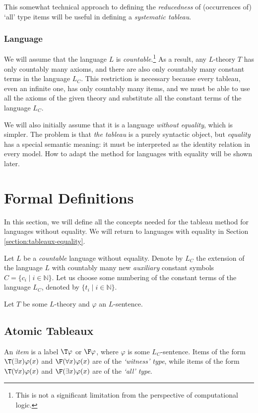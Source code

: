 This somewhat technical approach to defining the \emph{reducedness} of (occurrences of) `all' type items will be useful in defining a \emph{systematic tableau}.

\subsubsection{Language}

We will assume that the language $L$ is \emph{countable}.\footnote{This is not a significant limitation from the perspective of computational logic.} As a result, any $L$-theory $T$ has only countably many axioms, and there are also only countably many constant terms in the language $L_C$. This restriction is necessary because every tableau, even an infinite one, has only countably many items, and we must be able to use all the axioms of the given theory and substitute all the constant terms of the language $L_C$.

We will also initially assume that it is a language \emph{without equality}, which is simpler. The problem is that \emph{the tableau} is a purely syntactic object, but \emph{equality} has a special semantic meaning: it must be interpreted as the identity relation in every model. How to adapt the method for languages with equality will be shown later.

\section{Formal Definitions}

In this section, we will define all the concepts needed for the tableau method for languages without equality. We will return to languages with equality in Section \ref{section:tableaux-equality}.

Let $L$ be a \emph{countable} language without equality. Denote by $L_C$ the extension of the language $L$ with countably many new \emph{auxiliary} constant symbols $C=\{c_i\mid i\in \mathbb N\}$. Let us choose some numbering of the constant terms of the language $L_C$, denoted by $\{t_i\mid i\in\mathbb N\}$.

Let $T$ be some $L$-theory and $\varphi$ an $L$-sentence.

\subsection{Atomic Tableaux}

An \emph{item} is a label $\T\varphi$ or $\F\varphi$, where $\varphi$ is some $L_C$-sentence. Items of the form $\T(\exists x)\varphi(x)$ and $\F(\forall x)\varphi(x)$ are of the \emph{`witness' type}, while items of the form $\T(\forall x)\varphi(x)$ and $\F(\exists x)\varphi(x)$ are of the \emph{`all' type}.

